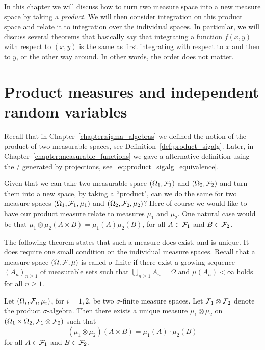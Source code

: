 
In this chapter we will discuss how to turn two measure space into a new measure space by taking a \emph{product}. We will then consider integration on this product space and relate it to integration over the individual spaces. In particular, we will discuss several theorems that basically say that integrating a function $f(x,y)$ with respect to $(x,y)$ is the same as first integrating with respect to $x$ and then to $y$, or the other way around. In other words, the order does not matter.

\section{Product measures and independent random variables}
\label{se:product-measures}

Recall that in Chapter~\ref{chapter:sigma_algebras} we defined the notion of the product of two measurable spaces, see Definition~\ref{def:product_sigalg}. Later, in Chapter~\ref{chapter:measurable_functions} we gave a alternative definition using the \sigalg/ generated by projections, see~\eqref{eq:product_sigalg_equivalence}. 

Given that we can take two measurable space $(\Omega_1, \mathcal F_1)$ and $(\Omega_2, \mathcal F_2)$ and turn them into a new space, by taking a ``product", can we do the same for two measure spaces $(\Omega_1, \mathcal F_1, \mu_1)$ and $(\Omega_2, \mathcal F_2, \mu_2)$? Here of course we would like to have our product measure relate to measures $\mu_1$ and $\mu_2$. One natural case would be that $\mu_1 \otimes \mu_2 (A \times B) =\mu_1(A) \mu_2(B)$, for all $A \in \mathcal F_1$ and $B \in \mathcal F_2$.

The following theorem states that such a measure does exist, and is unique. It does require one small condition on the individual measure spaces. Recall that a measure space $(\Omega, \mathcal F, \mu)$ is called $\sigma$-finite if there exist a growing sequence $(A_n)_{n \ge 1}$ of measurable sets such that $\bigcup_{n \ge 1} A_n = \Omega$ and $\mu(A_n) < \infty$ holds for all $n \ge 1$. 

\begin{theorem}
	\label{th:construction-product-measure}
	Let $(\Omega_i, \mathcal F_i, \mu_i)$, for $i = 1, 2$,  be two $\sigma$-finite measure spaces. Let $\mathcal F_1 \otimes \mathcal F_2$ denote the product $\sigma$-algebra. 
	Then there exists a unique measure $\mu_1 \otimes \mu_2$ on 
	$(\Omega_1 \times \Omega_2, \mathcal F_1 \otimes \mathcal F_2)$ such that 
	\[
	(\mu_1 \otimes \mu_2)(A \times B ) = \mu_1(A) \cdot \mu_2(B)
	\]
	for all $A \in \mathcal F_1$ and $B \in \mathcal F_2$.
\end{theorem}

